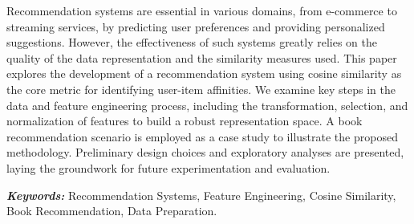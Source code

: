 Recommendation systems are essential in various domains, from e-commerce to streaming services, by predicting user preferences and providing personalized suggestions. However, the effectiveness of such systems greatly relies on the quality of the data representation and the similarity measures used. This paper explores the development of a recommendation system using cosine similarity as the core metric for identifying user-item affinities. We examine key steps in the data and feature engineering process, including the transformation, selection, and normalization of features to build a robust representation space. A book recommendation scenario is employed as a case study to illustrate the proposed methodology. Preliminary design choices and exploratory analyses are presented, laying the groundwork for future experimentation and evaluation.

\textbf{\textit{Keywords:}} Recommendation Systems, Feature Engineering, Cosine Similarity, Book Recommendation, Data Preparation.